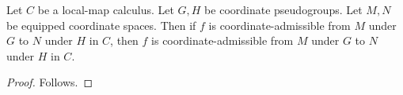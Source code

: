 


\begin{theorem}\label{coordinate_map_parameter_control}
    Let $C$ be a local-map calculus.
    Let $G,H$ be coordinate pseudogroups.
    Let $M,N$ be equipped coordinate spaces.
    Then if $f$ is coordinate-admissible from $M$ under $G$ to $N$ under $H$ in $C$,
        then $f$ is coordinate-admissible from $M$ under $G$ to $N$ under $H$ in $C$.
\end{theorem}
\begin{proof}
    Follows.
\end{proof}
